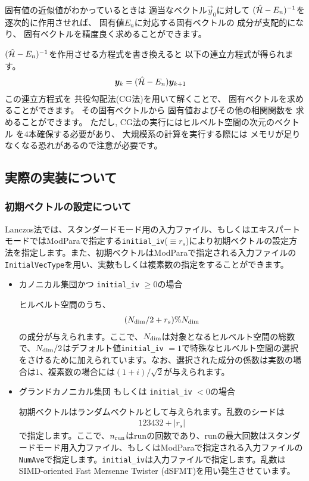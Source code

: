 固有値の近似値がわかっているときは
適当なベクトル$\vec{y}_{0}$に対して
$(\hat{\mathcal{H}}-E_{n})^{-1}$を
逐次的に作用させれば、
固有値$E_{n}$に対応する固有ベクトルの
成分が支配的になり、
固有ベクトルを精度良く求めることができます。

$(\hat{\mathcal{H}}-E_{n})^{-1}$を作用させる方程式を書き換えると
以下の連立方程式が得られます。
\begin{align}
\boldsymbol y_{k}&=(\hat{\mathcal{H}}-E_{n})\boldsymbol y_{k+1}
\end{align}
この連立方程式を
共役勾配法(CG法)を用いて解くことで、
固有ベクトルを求めることができます。
その固有ベクトルから
固有値およびその他の相関関数を
求めることができます。
ただし, CG法の実行にはヒルベルト空間の次元のベクトル
を4本確保する必要があり、
大規模系の計算を実行する際には
メモリが足りなくなる恐れがあるので注意が必要です。


\subsection{実際の実装について}
\subsubsection*{初期ベクトルの設定について}
Lanczos法では、スタンダードモード用の入力ファイル、もしくはエキスパートモードではModParaで指定する\verb|initial_iv|($\equiv r_s$)により初期ベクトルの設定方法を指定します。また、初期ベクトルはModParaで指定される入力ファイルの\verb|InitialVecType|を用い、実数もしくは複素数の指定をすることができます。
\begin{itemize}
\item{カノニカル集団かつ \verb|initial_iv| $\geq 0$の場合}

ヒルベルト空間のうち、
\begin{align}
(N_{\rm dim}/2 + r_s ) \% N_{\rm dim}
\end{align}
の成分が与えられます。ここで、$N_{\rm dim}$は対象となるヒルベルト空間の総数で、$N_{\rm dim}/2 $はデフォルト値\verb|initial_iv| $=1$で特殊なヒルベルト空間の選択をさけるために加えられています。なお、選択された成分の係数は実数の場合は$1$、複素数の場合には$(1+i)/\sqrt{2}$が与えられます。

\item{グランドカノニカル集団 もしくは \verb|initial_iv| $< 0$の場合}

初期ベクトルはランダムベクトルとして与えられます。乱数のシードは
\begin{align}
123432+|r_s|
\end{align}
で指定します。ここで、$n_{\rm run}$はrunの回数であり、runの最大回数はスタンダードモード用入力ファイル、もしくはModParaで指定される入力ファイルの\verb|NumAve|で指定します。\verb|initial_iv|は入力ファイルで指定します。乱数はSIMD-oriented Fast Mersenne Twister (dSFMT)を用い発生させています\cite{Mutsuo2008}。
\end{itemize}





